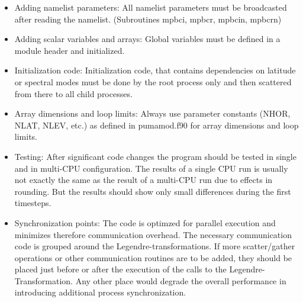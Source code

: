 \begin{itemize}

\item Adding namelist parameters:
   All namelist parameters must be broadcasted after reading
   the namelist. (Subroutines mpbci, mpbcr, mpbcin, mpbcrn)

\item Adding scalar variables and arrays:
   Global variables must be defined in a module header
   and initialized. 

\item Initialization code:
   Initialization code, that contains dependencies on
   latitude or spectral modes must be done by the
   root process only and then scattered from there
   to all child processes.

\item Array dimensions and loop limits:
   Always use parameter constants (NHOR, NLAT, NLEV, etc.)
   as defined in
   pumamod.f90 for array dimensions
   and loop limits. 

\item Testing:
   After significant code changes the program should be tested 
   in single and in multi-CPU configuration. The results
   of a single CPU run is usually not exactly the same as the
   result of a multi-CPU run due to effects in
   rounding. But the results should show only small
   differences during the first timesteps.

\item Synchronization points:
   The code is optimzed for parallel execution and minimizes
   therefore communication overhead. The necessary communication
   code is grouped around the Legendre-transformations.
   If more scatter/gather operations or other communication
   routines are to be added, they should be placed
   just before or after the execution of the calls to the
   Legendre-Transformation. Any other place would degrade
   the overall performance in introducing additional
   process synchronization.

\end{itemize}


